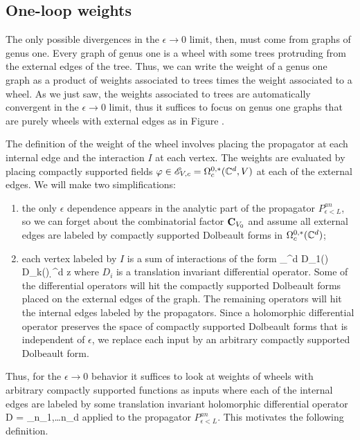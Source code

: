 \subsection{One-loop weights}

The only possible divergences in the $\epsilon \to 0$ limit, then, must come from graphs of genus one. 
Every graph of genus one is a wheel with some trees protruding from the external edges of the tree.
Thus, we can write the weight of a genus one graph as a product of weights associated to trees times the weight associated to a wheel.
As we just saw, the weights associated to trees are automatically convergent in the $\epsilon \to 0$ limit, thus it suffices to focus on genus one graphs that are purely wheels with external edges as in Figure . 

The definition of the weight of the wheel involves placing the propagator at each internal edge and the interaction $I$ at each vertex. 
The weights are evaluated by placing compactly supported fields $\varphi \in \mathscr E_{V,c} = \Omega^{0,*}_c(\mathbb C^d, V)$ at each of the external edges.
We will make two simplifications:
\begin{enumerate}
\item the only $\epsilon$ dependence appears in the analytic part of the propagator $P_{\epsilon<L}^{an}$, so we can forget about the combinatorial factor ${\bf C}_{V_0}$ and assume all external edges are labeled by compactly supported Dolbeault forms in $\Omega^{0,*}_c(\mathbb C^d)$;
\item each vertex labeled by $I$ is a sum of interactions of the form
\ben
\int_{\CC^d} D_1(\varphi) \cdots D_k(\varphi) \d^d z
\een
where $D_i$ is a translation invariant differential operator. 
Some of the differential operators will hit the compactly supported Dolbeault forms placed on the external edges of the graph.
The remaining operators will hit the internal edges labeled by the propagators.
Since a holomorphic differential operator preserves the space of compactly supported Dolbeault forms that is independent of $\epsilon$, we replace each input by an arbitrary compactly supported Dolbeault form.
\end{enumerate}

Thus, for the $\epsilon \to 0$ behavior it suffices to look at weights of wheels with arbitrary compactly supported functions as inputs where each of the internal edges are labeled by some translation invariant holomorphic differential operator 
\ben
D = \sum_{n_1,\ldots n_d} \cdots {}
\een
applied to the propagator $P_{\epsilon<L}^{an}$.
This motivates the following definition. 

